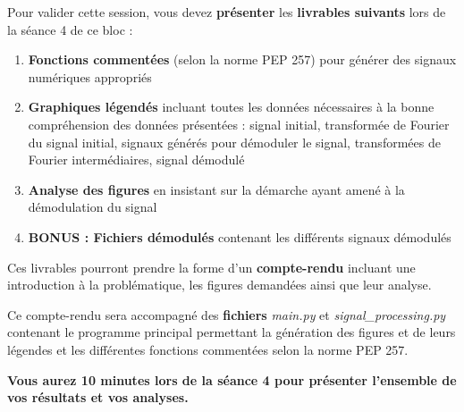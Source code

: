 
Pour valider cette session, vous devez \textbf{présenter} les \textbf{livrables suivants} lors de la séance 4 de ce bloc :

\begin{enumerate}
\item \textbf{Fonctions commentées} (selon la norme PEP 257) pour générer des signaux numériques appropriés
\item \textbf{Graphiques légendés} incluant toutes les données nécessaires à la bonne compréhension des données présentées : signal initial, transformée de Fourier du signal initial, signaux générés pour démoduler le signal, transformées de Fourier intermédiaires, signal démodulé
\item \textbf{Analyse des figures} en insistant sur la démarche ayant amené à la démodulation du signal
\item \textbf{BONUS : Fichiers démodulés} contenant les différents signaux démodulés
\end{enumerate}

\medskip

Ces livrables pourront prendre la forme d'un \textbf{compte-rendu} incluant une introduction à la problématique, les figures demandées ainsi que leur analyse.

Ce compte-rendu sera accompagné des \textbf{fichiers} \mbox{\textit{main.py}} et \mbox{\textit{signal\_processing.py}} contenant le programme principal permettant la génération des figures et de leurs légendes et les différentes fonctions commentées selon la norme PEP 257.

\textbf{Vous aurez 10 minutes lors de la séance 4 pour présenter l'ensemble de vos résultats et vos analyses.}